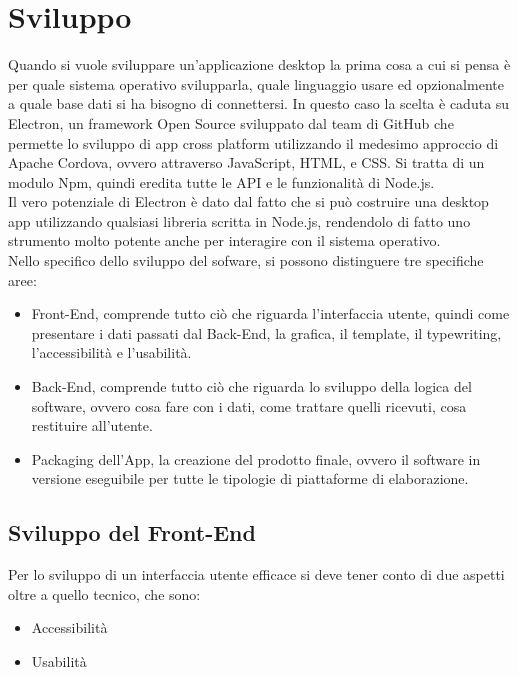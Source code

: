 
\chapter{Sviluppo}

Quando si vuole sviluppare un’applicazione desktop la prima cosa a cui si pensa è per quale sistema operativo svilupparla, quale linguaggio usare ed opzionalmente a quale base dati si ha bisogno di connettersi.
In questo caso la scelta è caduta su Electron, un framework Open Source sviluppato dal team di GitHub che permette lo sviluppo di app cross platform utilizzando il medesimo approccio di Apache Cordova, ovvero attraverso JavaScript, HTML, e CSS.
Si tratta di un modulo Npm, quindi eredita tutte le API e le funzionalità di Node.js.
\\
Il vero potenziale di Electron è dato dal fatto che si può costruire una desktop app utilizzando qualsiasi libreria scritta in Node.js, rendendolo di fatto uno strumento molto potente anche per interagire con il sistema operativo.
\\
Nello specifico dello sviluppo del sofware, si possono distinguere tre specifiche aree:
\begin{itemize}
	\item Front-End, comprende tutto ciò che riguarda l'interfaccia utente, quindi come presentare i dati passati dal Back-End, la grafica, il template, il typewriting, l’accessibilità e l’usabilità.
	\item Back-End, comprende tutto ciò che riguarda lo sviluppo della logica del software, ovvero cosa fare con i dati, come trattare quelli ricevuti, cosa restituire all'utente.
	\item Packaging dell'App, la creazione del prodotto finale, ovvero il software in versione eseguibile per tutte le tipologie di piattaforme di elaborazione.
\end{itemize}



\section{Sviluppo del Front-End}

Per lo sviluppo di un interfaccia utente efficace si deve tener conto di due aspetti oltre a quello tecnico, che sono:
\begin{itemize}
\item Accessibilità
\item Usabilità
\end{itemize}

